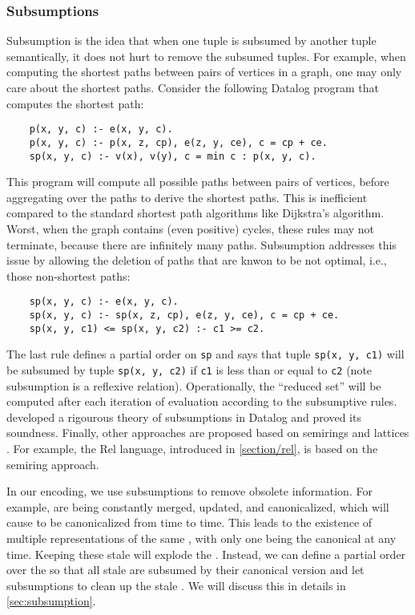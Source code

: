 \subsubsection*{Subsumptions}
Subsumption \citep{datalog-subsumption} is the idea that
 when one tuple is subsumed by another tuple semantically,
 it does not hurt to remove the subsumed tuples.
For example, 
 when computing the shortest paths between pairs of vertices in a graph,
 one may only care about the shortest paths. 
Consider the following Datalog program that computes the shortest path:
\begin{verbatim}
    p(x, y, c) :- e(x, y, c).
    p(x, y, c) :- p(x, z, cp), e(z, y, ce), c = cp + ce.
    sp(x, y, c) :- v(x), v(y), c = min c : p(x, y, c).
\end{verbatim}
This program will compute all possible paths between pairs of vertices,
 before aggregating over the paths to derive the shortest paths.
This is inefficient compared to the standard shortest path algorithms 
 like Dijkstra's algorithm.
Worst, when the graph contains (even positive) cycles, 
 these rules may not terminate, 
 because there are infinitely many paths.
Subsumption addresses this issue 
 by allowing the deletion of paths that are knwon to be not optimal,
 i.e., those non-shortest paths:
\begin{verbatim}
    sp(x, y, c) :- e(x, y, c).
    sp(x, y, c) :- sp(x, z, cp), e(z, y, ce), c = cp + ce.
    sp(x, y, c1) <= sp(x, y, c2) :- c1 >= c2.
\end{verbatim}
The last rule defines a partial order on
 \verb|sp| and says that tuple \verb|sp(x, y, c1)| 
 will be subsumed by tuple \verb|sp(x, y, c2)| if
 \verb|c1| is less than or equal to \verb|c2| 
 (note subsumption is a reflexive relation).
Operationally,
 the ``reduced set'' will be computed 
 after each iteration of evaluation according to
 the subsumptive rules.
\citet{datalog-subsumption} developed 
 a rigourous theory of subsumptions in Datalog
 and proved its soundness.
Finally,
 other approaches are proposed based on 
 semirings \citep{datalogo,datalogo-convergence}
 and lattices \citep{flix}.
For example, the Rel language,
 introduced in \autoref{section/rel},
 is based on the semiring approach.

In our encoding, we use subsumptions 
 to remove obsolete information.
For example,
 \eclasses are being constantly merged, updated, and canonicalized,
 which will cause \enodes to be canonicalized from time to time.
This leads to the existence of multiple representations of
 the same \enode, with only one being the canonical at any time.
Keeping these stale \enodes will explode the \egraph.
Instead,
 we can define a partial order over the \egraphs
 so that all stale \enodes are subsumed 
 by their canonical version and 
 let subsumptions to clean up the stale \enodes.
We will discuss this in details in \autoref{sec:subsumption}.
 
